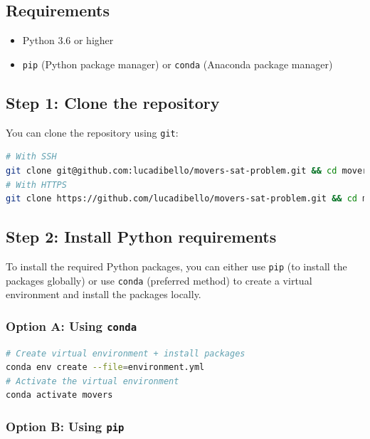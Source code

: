 \documentclass[a4paper, 11pt]{article}
\begin{document}
\subsection{Requirements}

\begin{itemize}
    \item Python 3.6 or higher
    \item \texttt{pip} (Python package manager) or \texttt{conda} (Anaconda package manager)
\end{itemize}

\subsection{Step 1: Clone the repository}

You can clone the repository using \texttt{git}:

\begin{lstlisting}[language=bash]
# With SSH
git clone git@github.com:lucadibello/movers-sat-problem.git && cd movers-sat-problem
# With HTTPS
git clone https://github.com/lucadibello/movers-sat-problem.git && cd movers-sat-problem
\end{lstlisting}

\subsection{Step 2: Install Python requirements}

To install the required Python packages, you can either use \texttt{pip} (to install the packages globally) or use \texttt{conda} (preferred method) to create a virtual environment and install the packages locally.

\subsubsection*{Option A: Using \texttt{conda}}

\begin{lstlisting}[language=bash]
# Create virtual environment + install packages
conda env create --file=environment.yml
# Activate the virtual environment
conda activate movers
\end{lstlisting}

\subsubsection*{Option B: Using \texttt{pip}}
\end{document}
